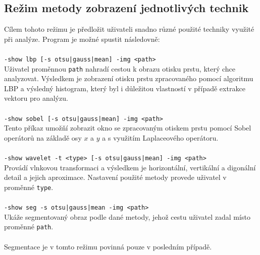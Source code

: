 \subsection{Režim metody zobrazení jednotlivých technik}
Cílem tohoto režimu je předložit uživateli snadno různé použité techniky využité při analýze. Program je možné spustit následovně:\\\\
\verb=-show lbp [-s otsu|gauss|mean] -img <path>=\\
Uživatel proměnnou \verb=path= nahradí cestou k obrazu otisku prstu, který chce analyzovat. Výsledkem je zobrazení otisku prstu zpracovaného pomocí algoritmu LBP a výsledný histogram, který byl i důležitou vlastností v případě extrakce vektoru pro analýzu.\\\\
\verb=-show sobel [-s otsu|gauss|mean] -img <path>=\\
Tento příkaz umožňí zobrazit okno se zpracovaným otiskem prstu pomocí Sobel operátorů na základě osy $x$ a $y$ a s využitím Laplaceového operátoru.\\\\
\verb=-show wavelet -t <type> [-s otsu|gauss|mean] -img <path>=\\
Provádí vlnkovou transformaci a výsledkem je horizontální, vertikální a digonální detail a jejich aproximace. Nastavení použité metody provede uživatel v proměnné \verb=type=.\\\\
\verb=-show seg -s otsu|gauss|mean -img <path>=\\
Ukáže segmentovaný obraz podle dané metody, jehož cestu uživatel zadal místo proměnné \verb=path=.\\\\
Segmentace je v tomto režimu povinná pouze v posledním případě.

